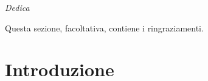 \documentclass[12pt,italian]{report}
\begin{document}
\frontespizio
\beforepreface

% 
%

{\raggedleft \large \sl Dedica \\}
         
% 
%


%
%

Questa sezione, facoltativa, contiene i ringraziamenti.

%
%

\afterpreface

% 
% 

\chapter{Introduzione}
\label{cap:introduzione}
%
\end{document}
